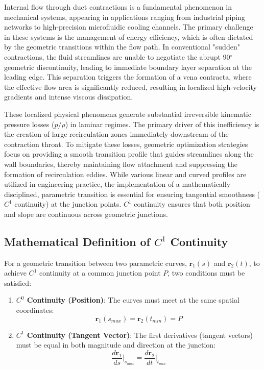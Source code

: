 \documentclass[12pt, a4paper]{article}
\begin{document}
Internal flow through duct contractions is a fundamental phenomenon in mechanical systems, appearing in applications ranging from industrial piping networks to high-precision microfluidic cooling channels. The primary challenge in these systems is the management of energy efficiency, which is often dictated by the geometric transitions within the flow path. In conventional "sudden" contractions, the fluid streamlines are unable to negotiate the abrupt 90$^\circ$ geometric discontinuity, leading to immediate boundary layer separation at the leading edge. This separation triggers the formation of a vena contracta, where the effective flow area is significantly reduced, resulting in localized high-velocity gradients and intense viscous dissipation.

These localized physical phenomena generate substantial irreversible kinematic pressure losses ($p/\rho$) in laminar regimes. The primary driver of this inefficiency is the creation of large recirculation zones immediately downstream of the contraction throat. To mitigate these losses, geometric optimization strategies focus on providing a smooth transition profile that guides streamlines along the wall boundaries, thereby maintaining flow attachment and suppressing the formation of recirculation eddies. While various linear and curved profiles are utilized in engineering practice, the implementation of a mathematically disciplined, parametric transition is essential for ensuring tangential smoothness ($C^1$ continuity) \cite{piegl1996nurbs} at the junction points. $C^1$ continuity ensures that both position and slope are continuous across geometric junctions.

\subsection{Mathematical Definition of $C^1$ Continuity}

For a geometric transition between two parametric curves, $\mathbf{r}_1(s)$ and $\mathbf{r}_2(t)$, to achieve $C^1$ continuity at a common junction point $P$, two conditions must be satisfied:

\begin{enumerate}
	\item \textbf{$C^0$ Continuity (Position)}: The curves must meet at the same spatial coordinates:
	\begin{equation}
		\mathbf{r}_1(s_{max}) = \mathbf{r}_2(t_{min}) = P
	\end{equation}
	
	\item \textbf{$C^1$ Continuity (Tangent Vector)}: The first derivatives (tangent vectors) must be equal in both magnitude and direction at the junction:
	\begin{equation}
		\frac{d\mathbf{r}_1}{ds}\Big|_{s_{max}} = \frac{d\mathbf{r}_2}{dt}\Big|_{t_{min}}
	\end{equation}
\end{enumerate}
\end{document}
